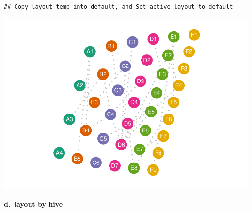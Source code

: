 \documentclass[
]{article}
\let\oldparagraph\paragraph
\renewcommand{\paragraph}[1]{\oldparagraph{#1}\mbox{}}
\begin{document}
\begin{verbatim}
## Copy layout temp into default, and Set active layout to default
\end{verbatim}

\includegraphics{ReadMe_files/figure-latex/unnamed-chunk-12-1.pdf}

\hypertarget{d.-layout-by-hive}{%
\paragraph{d.~layout by hive}\label{d.-layout-by-hive}}
\end{document}
